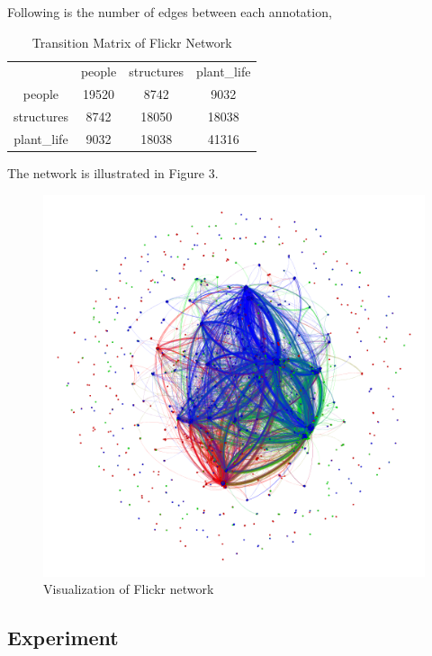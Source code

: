 Following is the number of edges between each annotation,
\begin{table}[!ht]
\centering
\begin{tabular}{c|c|c|c}
\toprule
& people & structures & plant\_life\\
people & 19520 & 8742 & 9032\\
structures & 8742 & 18050 & 18038\\
plant\_life & 9032 & 18038 & 41316\\
\bottomrule
\end{tabular}
\caption{Transition Matrix of Flickr Network}
\end{table}

The network is illustrated in Figure 3.

\begin{figure}[!ht]
	\centering
	\begin{minipage}[b]{0.5\linewidth}
	\centering
	\includegraphics[width=\textwidth]{FIG/flickr.png}
	\caption{Visualization of Flickr network}
	\label{fig:figure1}
	\end{minipage}
\end{figure}	

\subsection{Experiment}

